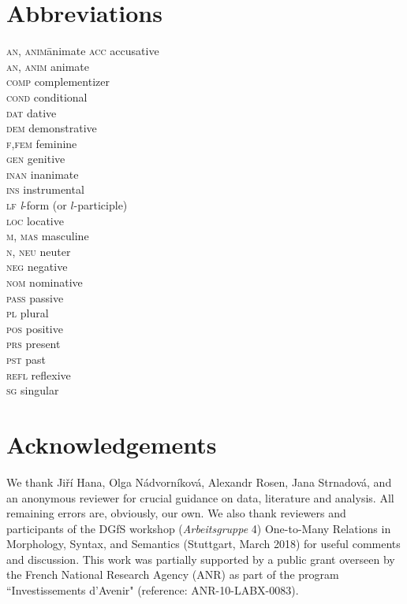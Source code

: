 \documentclass[output=paper]{langsci/langscibook}
\begin{document}
\section*{Abbreviations}
\begin{multicols}{2}
\begin{tabbing}
\textsc{an, anim}\quad\= animate\kill
\textsc{acc}     \> accusative\\
\textsc{an, anim}\> animate\\
\textsc{comp}    \> complementizer\\
\textsc{cond}    \> conditional\\
\textsc{dat}     \> dative\\
\textsc{dem}     \> demonstrative\\
\textsc{f,fem}   \> feminine\\
\textsc{gen}     \> genitive\\
\textsc{inan}    \> inanimate\\
\textsc{ins}     \> instrumental\\
\textsc{lf}      \> \emph{l}-form (or $l$-participle)\\
\textsc{loc}     \> locative\\
\textsc{m, mas}  \> masculine\\
\textsc{n, neu}  \> neuter\\
\textsc{neg}     \> negative\\
\textsc{nom}     \> nominative\\
\textsc{pass}    \> passive\\
\textsc{pl}      \> plural\\
\textsc{pos}     \> positive\\
\textsc{prs}     \> present\\
\textsc{pst}     \> past\\
\textsc{refl}    \> reflexive\\
\textsc{sg}      \> singular
\end{tabbing}
\end{multicols}

\section*{Acknowledgements}

We thank Jiří Hana, Olga Nádvorníková, Alexandr Rosen,  Jana Strnadová, and an anonymous reviewer for crucial guidance on data, literature and analysis. All remaining errors are, obviously, our own. We also thank reviewers and participants of the DGfS workshop  (\textit{Arbeitsgruppe} 4) One-to-Many Relations in Morphology, Syntax, and Semantics (Stuttgart, March 2018) for useful comments and discussion. This work was partially supported by a public grant overseen by the French National Research Agency
(ANR) as part of the program ``Investissements d'Avenir" (reference: ANR-10-LABX-0083).


{\sloppy\printbibliography[heading=subbibliography,notkeyword=this]}
\end{document}
